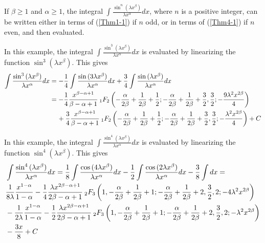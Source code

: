\documentclass[smallextended]{svjour3}
\begin{document}
If $\beta\ge1$ and $\alpha\ge1$, the integral $\int\frac{\sin^n{(\lambda x^\beta)}}{\lambda x^\alpha}dx$, where $n$ is a positive integer, can be written either in terms of (\ref{Thm1-1}) if $n$ odd, or in terms of (\ref{Thm4-1}) if $n$ even, and then evaluated.
\begin{example}
In this example, the integral $\int\frac{\sin^3{(\lambda x^\beta)}}{\lambda x^\alpha}dx$ is evaluated by linearizing the function $\sin^3{(\lambda x^\beta)}$. This gives
\begin{align}
\int\frac{\sin^3{(\lambda x^\beta)}}{\lambda x^\alpha}dx&=-\frac{1}{4}\int\frac{\sin{(3\lambda x^\beta)}}{\lambda x^\alpha}dx+\frac{3}{4}\int\frac{\sin{(\lambda x^\beta)}}{\lambda x^\alpha}dx
\nonumber\\ &=-\frac{1}{4}\frac{x^{\beta-\alpha+1}}{\beta-\alpha+1}\hspace{.075cm} _{1}F_{2}\left(-\frac{\alpha}{2\beta}+\frac{1}{2\beta}+\frac{1}{2};-\frac{\alpha}{2\beta}+\frac{1}{2\beta}+\frac{3}{2},\frac{3}{2};-\frac{9\lambda^2 x^{2\beta}}{4}\right)
\nonumber\\ &\hspace{.4cm}+\frac{3}{4}\frac{x^{\beta-\alpha+1}}{\beta-\alpha+1}\hspace{.075cm} _{1}F_{2}\left(-\frac{\alpha}{2\beta}+\frac{1}{2\beta}+\frac{1}{2};-\frac{\alpha}{2\beta}+\frac{1}{2\beta}+\frac{3}{2},\frac{3}{2};-\frac{\lambda^2 x^{2\beta}}{4}\right)+C
\end{align}
\label{ex3}
\end{example}
\begin{example}
In this example, the integral $\int\frac{\sin^4{(\lambda x^\beta)}}{\lambda x^\alpha}dx$ is evaluated by linearizing the function $\sin^4{(\lambda x^\beta)}$. This gives
\begin{align}
&\int\frac{\sin^4{(\lambda x^\beta)}}{\lambda x^\alpha}dx=\frac{1}{8}\int\frac{\cos{(4\lambda x^\beta)}}{\lambda x^\alpha}dx-\frac{1}{2}\int\frac{\cos{(2\lambda x^\beta)}}{\lambda x^\alpha}dx-\frac{3}{8}\int dx=
\nonumber\\ &\frac{1}{8\lambda}\frac{x^{1-\alpha}}{1-\alpha}-\frac{1}{4}\frac{\lambda x^{2\beta-\alpha+1}}{2\beta-\alpha+1}\hspace{.075cm} _{2}F_{3}\left(1,-\frac{\alpha}{2\beta}+\frac{1}{2\beta}+1;-\frac{\alpha}{2\beta}+\frac{1}{2\beta}+2,\frac{3}{2},2;-4\lambda^2 x^{2\beta}\right)
\nonumber\\ &-\frac{1}{2\lambda}\frac{x^{1-\alpha}}{1-\alpha}-\frac{1}{2}\frac{\lambda x^{2\beta-\alpha+1}}{2\beta-\alpha+1}\hspace{.075cm} _{2}F_{3}\left(1,-\frac{\alpha}{2\beta}+\frac{1}{2\beta}+1;-\frac{\alpha}{2\beta}+\frac{1}{2\beta}+2,\frac{3}{2},2;-\lambda^2 x^{2\beta}\right)\nonumber\\ &-\frac{3x}{8}+C
\end{align}
\label{ex4}
\end{example}
\end{document}
